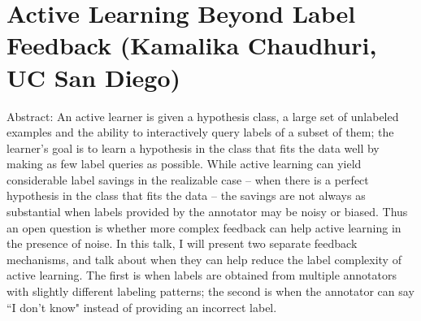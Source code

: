 \section{Active Learning Beyond Label Feedback (Kamalika Chaudhuri, UC San Diego)}

Abstract: An active learner is given a hypothesis class, a large set of unlabeled examples and the ability to interactively query labels of a subset of them; the learner's goal is to learn a hypothesis in the class that fits the data well by making as few label queries as possible. While active learning can yield considerable label savings in the realizable case -- when there is a perfect hypothesis in the class that fits the data -- the savings are not always as substantial when labels provided by the annotator may be noisy or biased. Thus an open question is whether more complex feedback can help active learning in the presence of noise. In this talk, I will present two separate feedback mechanisms, and talk about when they can help reduce the label complexity of active learning. The first is when labels are obtained from multiple annotators with slightly different labeling patterns; the second is when the annotator can say ``I don't know" instead of providing an incorrect label.